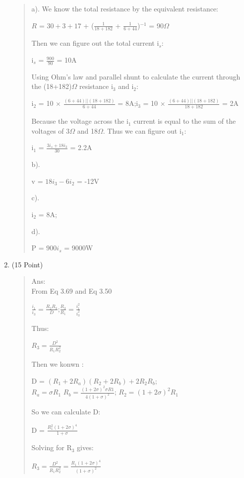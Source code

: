 \documentclass[12pt,a4paper]{article}
\begin{document}
\begin{enumerate}
\begin{quote}
		\quad a). We know the total resistance by the equivalent resistance:
		\begin{center}
			$R$ = $30+3+17$ + ($\frac{1}{18+182}$ + $\frac{1}{6+44}$)$^{-1}$ = 90$\Omega$
		\end{center}
		\qquad Then we can figure out the total current i$_s$:
		\begin{center}
			i$_s$ = $\frac{900}{90}$ = 10A
		\end{center}
		\qquad Using Ohm's law and parallel shunt to calculate the current through the (18+182)$\Omega$ resistance i$_3$ and i$_2$:
		\begin{center}
			i$_2$ = 10 $\times$ $\frac{(6+44)||(18+182)}{6+44}$ = 8A;\quad i$_3$ = 10 $\times$ $\frac{(6+44)||(18+182)}{18+182}$ = 2A
		\end{center}
		\qquad Because the voltage across the i$_1$ current is equal to the sum  of the voltages of 3$\Omega$ and 18$\Omega$. Thus we can figure out i$_1$:
		\begin{center}
			i$_1$ = $\frac{3i_s + 18i_3}{30}$ = 2.2A
		\end{center}
		
		\quad b).
		\begin{center}
			v = $18i_3 - 6i_2$ = -12V
		\end{center}
	
		\quad c).
		\begin{center}
			i$_2$ = 8A;
		\end{center}
		
		\quad d).
		\begin{center}
			P = $900i_s$ = 9000W
		\end{center}
		\end{quote}
	
	\item(15 Point)	
		\begin{quote}
			Ans:\\
		\qquad From Eq 3.69 and Eq 3.50
		\begin{center}
				$\frac{i_1}{i_3} = \frac{R_2R_3}{D}$;\qquad $\frac{R_3}{R_1} = \frac{i_1^2}{i_3^2}$
		\end{center}
		 Thus:
		\begin{center}
			$R_3 = \frac{D^2}{R_1R_2^2}$
		\end{center}
		 Then we konwn :
		\begin{center}
			D = $(R_1 + 2R_a)(R_2 + 2R_b) + 2R_2R_b$;\\
			$R_a = \sigma R_1$\qquad
			$R_b = \frac{(1+2\sigma)^2\sigma R1}{4(1+\sigma)^2}$;\qquad
			$R_2 = (1+2\sigma)^2R_1$ 
		\end{center}
		 So we can calculate D:\\
		\begin{center}
			D = $\frac{R_1^2(1+2\sigma)^4}{1+\sigma}$
		\end{center}
		 Solving for R$_3$ gives:
			\begin{center}
				$R_3 = \frac{D^2}{R_1R_2^2} = \frac{R_1(1+2\sigma)^4}{(1+\sigma)^2}$
			\end{center}
			

\end{quote}
\end{enumerate}
\end{document}
